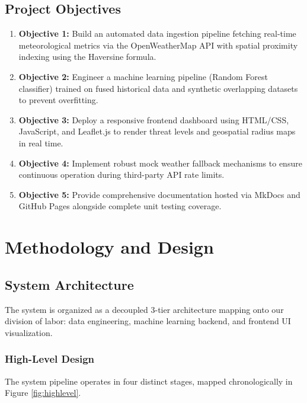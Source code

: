 \documentclass[12pt,a4paper]{report}
\begin{document}
\section{Project Objectives}
\begin{enumerate}
    \item \textbf{Objective 1:} Build an automated data ingestion pipeline fetching real-time meteorological metrics via the OpenWeatherMap API with spatial proximity indexing using the Haversine formula.
    \item \textbf{Objective 2:} Engineer a machine learning pipeline (Random Forest classifier) trained on fused historical data and synthetic overlapping datasets to prevent overfitting.
    \item \textbf{Objective 3:} Deploy a responsive frontend dashboard using HTML/CSS, JavaScript, and Leaflet.js to render threat levels and geospatial radius maps in real time.
    \item \textbf{Objective 4:} Implement robust mock weather fallback mechanisms to ensure continuous operation during third-party API rate limits.
    \item \textbf{Objective 5:} Provide comprehensive documentation hosted via MkDocs and GitHub Pages alongside complete unit testing coverage.
\end{enumerate}

\chapter{Methodology and Design}

\section{System Architecture}
The system is organized as a decoupled 3-tier architecture mapping onto our division of labor: data engineering, machine learning backend, and frontend UI visualization.

\subsection{High-Level Design}
The system pipeline operates in four distinct stages, mapped chronologically in Figure \ref{fig:highlevel}.
\end{document}
